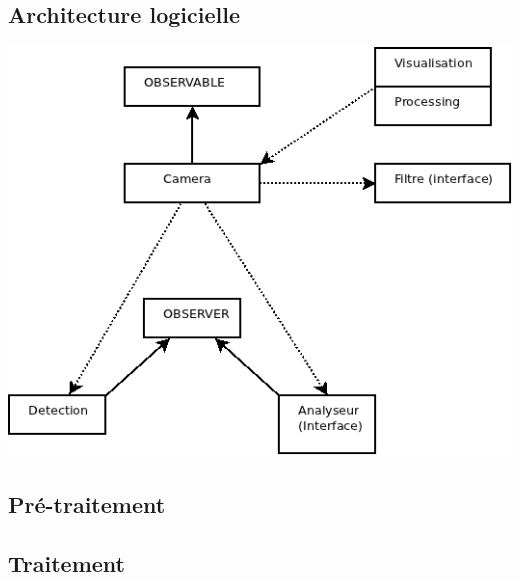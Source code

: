 \subsection{Architecture logicielle}

\begin{center}
\includegraphics[scale=0.66]{Archi/Architecture.png}
\end{center}

\subsection{Pré-traitement} %


\subsection{Traitement}

